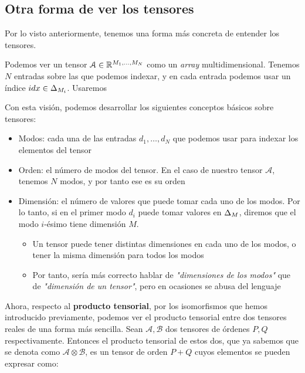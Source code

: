 \subsection{Otra forma de ver los tensores} \label{sec:otra_forma_tensores}

Por lo visto anteriormente, tenemos una forma más concreta de entender los tensores.

Podemos ver un tensor $\mathcal{A} \in \mathbb{R}^{M_1, \ldots, M_N}$ como un \textit{array} multidimensional. Tenemos $N$ entradas sobre las que podemos indexar, y en cada entrada podemos usar un índice $idx \in \Delta_{M_i}$. Usaremos

Con esta visión, podemos desarrollar los siguientes conceptos básicos sobre tensores:

\begin{itemize}
    \item Modos: cada una de las entradas $d_1, \ldots, d_N$ que podemos usar para indexar los elementos del tensor
    \item Orden: el número de modos del tensor. En el caso de nuestro tensor $\mathcal{A}$, tenemos $N$ modos, y por tanto ese es su orden
    \item Dimensión: el número de valores que puede tomar cada uno de los modos. Por lo tanto, si en el primer modo $d_i$ puede tomar valores en $\Delta_{M}$, diremos que el modo $i$-ésimo tiene dimensión $M$.
        \begin{itemize}
            \item Un tensor puede tener distintas dimensiones en cada uno de los modos, o tener la misma dimensión para todos los modos
            \item Por tanto, sería más correcto hablar de \textit{"dimensiones de los modos"} que de \textit{"dimensión de un tensor"}, pero en ocasiones se abusa del lenguaje
        \end{itemize}
\end{itemize}

Ahora, respecto al \textbf{producto tensorial}, por los isomorfismos que hemos introducido previamente, podemos ver el producto tensorial entre dos tensores reales de una forma más sencilla. Sean $\mathcal{A}, \mathcal{B}$ dos tensores de órdenes $P, Q$ respectivamente. Entonces el producto tensorial de estos dos, que ya sabemos que se denota como $\mathcal{A} \otimes \mathcal{B}$, es un tensor de orden $P + Q$ cuyos elementos se pueden expresar como:



